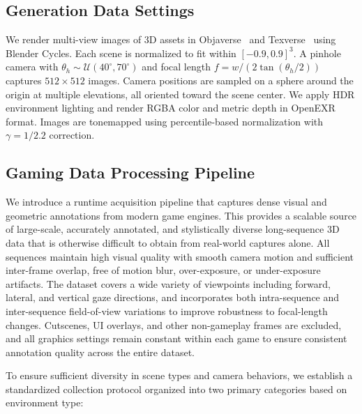 \subsection{Generation Data Settings}
\label{sec:gen_data}

We render multi-view images of 3D assets in Objaverse~\cite{deitke2023objaverse} 
and Texverse~\cite{zhang2025texverse} using Blender Cycles. Each scene is normalized to fit within $[-0.9, 0.9]^3$. A pinhole camera with $\theta_h \sim \mathcal{U}(40^\circ, 70^\circ)$ and focal length $f = w / (2\tan(\theta_h/2))$ captures $512\times512$ images. Camera positions are sampled on a sphere around the origin at multiple elevations, all oriented toward the scene center. We apply HDR environment lighting and render RGBA color and metric depth in OpenEXR format. Images are tonemapped using percentile-based normalization with $\gamma{=}1/2.2$ correction.

\subsection{Gaming Data Processing Pipeline}
\label{sec:gaming_data}


\noindent We introduce a runtime acquisition pipeline that captures dense visual and geometric annotations from modern game engines. This provides a scalable source of large-scale, accurately annotated, and stylistically diverse long-sequence 3D data that is otherwise difficult to obtain from real-world captures alone. All sequences maintain high visual quality with smooth camera motion and sufficient inter-frame overlap, free of motion blur, over-exposure, or under-exposure artifacts. The dataset covers a wide variety of viewpoints including forward, lateral, and vertical gaze directions, and incorporates both intra-sequence and inter-sequence field-of-view variations to improve robustness to focal-length changes. Cutscenes, UI overlays, and other non-gameplay frames are excluded, and all graphics settings remain constant within each game to ensure consistent annotation quality across the entire dataset.

To ensure sufficient diversity in scene types and camera behaviors, we
establish a standardized collection protocol organized into two primary categories based on environment type:

